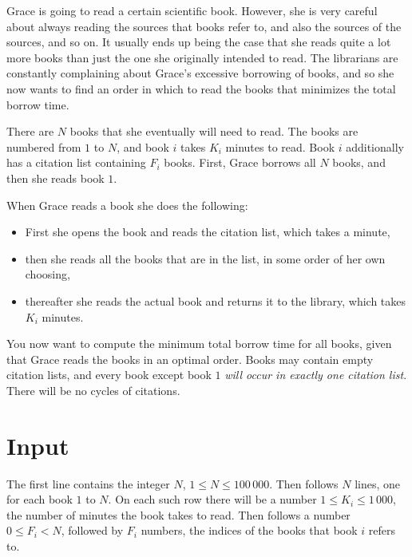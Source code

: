 
Grace is going to read a certain scientific book. However, she is very careful about always reading the sources that books refer to, and also the sources of the sources, and so on. It usually ends up being the case that she reads quite a lot more books than just the one she originally intended to read. The librarians are constantly complaining about Grace's excessive borrowing of books, and so she now wants to find an order in which to read the books that minimizes the total borrow time.

There are $N$ books that she eventually will need to read. The books are numbered from $1$ to $N$, and book $i$ takes $K_i$ minutes to read. Book $i$ additionally has a citation list containing $F_i$ books. First, Grace borrows all $N$ books, and then she reads book $1$.

When Grace reads a book she does the following:

\begin{itemize}
\item First she opens the book and reads the citation list, which takes a minute,
\item then she reads all the books that are in the list, in some order of her own choosing,
\item thereafter she reads the actual book and returns it to the library, which takes $K_i$ minutes.
\end{itemize}

You now want to compute the minimum total borrow time for all books, given that Grace reads the books in an optimal order. Books may contain empty citation lists, and every book except book $1$ {\em will occur in exactly one citation list}. There will be no cycles of citations.



\section*{Input}
The first line contains the integer $N$, $1 \leq N \leq 100\,000$. Then follows $N$ lines, one for each book $1$ to $N$. On each such row there will be a number $1 \leq K_i \leq 1\,000$, the number of minutes the book takes to read. Then follows a number $0 \leq F_i < N$, followed by $F_i$ numbers, the indices of the books that book $i$ refers to.

